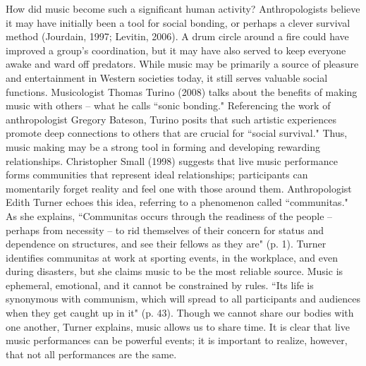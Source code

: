 How did music become such a significant human activity? Anthropologists believe it may have initially been a tool for social bonding, or perhaps a clever survival method (Jourdain, 1997; Levitin, 2006). A drum circle around a fire could have improved a group's coordination, but it may have also served to keep everyone awake and ward off predators. While music may be primarily a source of pleasure and entertainment in Western societies today, it still serves valuable social functions. Musicologist Thomas Turino (2008) talks about the benefits of making music with others -- what he calls ``sonic bonding." Referencing the work of anthropologist Gregory Bateson, Turino posits that such artistic experiences promote deep connections to others that are crucial for ``social survival." Thus, music making may be a strong tool in forming and developing rewarding relationships. Christopher Small (1998) suggests that live music performance forms communities that represent ideal relationships; participants can momentarily forget reality and feel one with those around them. Anthropologist Edith Turner echoes this idea, referring to a phenomenon called ``communitas." As she explains, ``Communitas occurs through the readiness of the people -- perhaps from necessity -- to rid themselves of their concern for status and dependence on structures, and see their fellows as they are" (p. 1). Turner identifies communitas at work at sporting events, in the workplace, and even during disasters, but she claims music to be the most reliable source. Music is ephemeral, emotional, and it cannot be constrained by rules. ``Its life is synonymous with communism, which will spread to all participants and audiences when they get caught up in it" (p. 43). Though we cannot share our bodies with one another, Turner explains, music allows us to share time. It is clear that live music performances can be powerful events; it is important to realize, however, that not all performances are the same.
